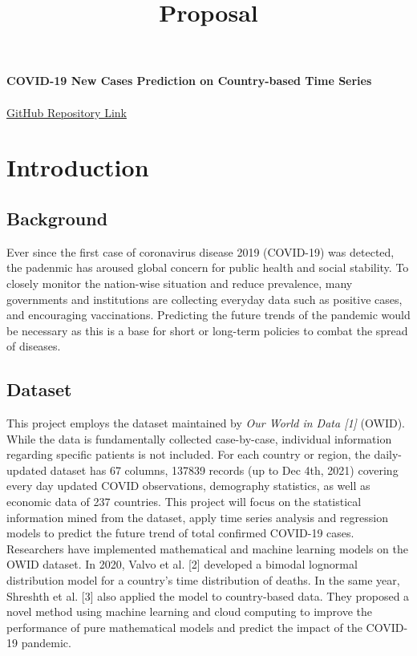 \documentclass[11pt]{article}
\title{Proposal}
\begin{document}
\begin{center}
	{\LARGE \bf   COVID-19 New Cases Prediction on Country-based Time Series}\\
	\vspace{0.3cm}{Nange Li, Brown University}\\
	{\href{https://github.com/7ericany/1030Project/tree/master}{GitHub Repository Link}}
\end{center}

\section{Introduction}
\subsection{Background}
Ever since the first case of coronavirus disease 2019 (COVID-19) was detected, the padenmic has aroused global concern for public health and social stability. To closely monitor the nation-wise situation and reduce prevalence, many governments and institutions are collecting everyday data such as positive cases, and encouraging vaccinations. Predicting the future trends of the pandemic would be necessary as this is a base for short or long-term policies to combat the spread of diseases.

\subsection{Dataset}
This project employs the dataset maintained by {\em Our World in Data [1]} (OWID). While the data is fundamentally collected case-by-case, individual information regarding specific patients is not included. For each country or region, the daily-updated dataset has 67 columns, 137839 records (up to Dec 4th, 2021) covering every day updated COVID observations, demography statistics, as well as economic data of 237 countries.  This project will focus on the statistical information mined from the dataset, apply time series analysis and regression models to predict the future trend of total confirmed COVID-19 cases. \\

Researchers have implemented mathematical and machine learning models on the OWID dataset. In 2020, Valvo et al. [2] developed a bimodal lognormal distribution model for a country's time distribution of deaths. In the same year, Shreshth et al. [3] also applied the model to country-based data. They proposed a novel method using machine learning and cloud computing to improve the performance of pure mathematical models and predict the impact of the COVID-19 pandemic. 
\end{document}
